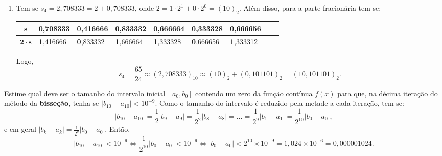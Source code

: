\documentclass[12pt,a4paper]{article}
\begin{document}
\begin{ExerciseList}
\begin{enumerate}
\item Tem-se $s_4 = 2,708333 = 2 + 0,708333$, onde $2 = 1 \cdot 2^1 + 0 \cdot 2^0 = (10)_{2}$. Além disso, para a parte fracionária tem-se:

\begin{center}
\begin{tabular}{|c|l|l|l|l|l|l|l|l|}
\hline
$\mathbf{s}$
& 0,708333
& 0,416666
& 0,833332
& 0,666664
& 0,333328
& 0,666656
 \\ \hline
$\mathbf{2\cdot s}$
& \textbf{1},416666
& \textbf{0},833332
& \textbf{1},666664
& \textbf{1},333328
& \textbf{0},666656
& \textbf{1},333312
\\ \hline
\end{tabular}
\end{center}

Logo,
\[
s_4
= \dfrac{65}{24}
\approx (2,708333)_{10}
\approx (10)_2 + (0,101101)_2
= (10,101101)_2.
\]
\end{enumerate}

\Exercise[title={2,0}] Estime qual deve ser o tamanho do intervalo inicial $[a_0, b_0]$ contendo um zero da função contínua $f(x)$ para que, na décima iteração do método da \textbf{bisseção}, tenha-se $|b_{10} - a_{10}| < 10^{-9}$.
\Answer Como o tamanho do intervalo é reduzido pela metade a cada iteração, tem-se:
\[
  |b_{10} - a_{10}|
  = \frac{1}{2}|b_9 - a_9|
  = \frac{1}{2^2}|b_8 - a_8|
  = \ldots
  = \frac{1}{2^9}|b_1 - a_1|
  = \frac{1}{2^{10}}|b_0 - a_0|,
\]
e em geral $|b_{k} - a_{k}| = \frac{1}{2^{k}}|b_0 - a_0|$. Então,
\[
  |b_{10}-a_{10}| < 10^{-9}
  \Leftrightarrow
  \frac{1}{2^{10}}|b_0 - a_0| < 10^{-9}
  \Leftrightarrow
  |b_0 - a_0| < 2^{10} \times 10^{-9}
  = 1,024 \times 10^{-6}
  = 0,000001024.
\]


\end{ExerciseList}
\end{document}
